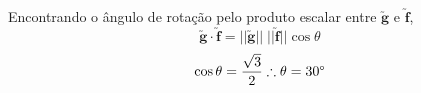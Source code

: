 \begin{enumerate}
		Encontrando o ângulo de rotação pelo produto escalar entre $\utilde{\mathbf{g}}$ e $\utilde{\mathbf{f}}$,
		\[\utilde{\mathbf{g}}\cdot\utilde{\mathbf{f}}=||\utilde{\mathbf{g}}||\;||\utilde{\mathbf{f}}||\cos\theta\]
		\[\cos\theta=\frac{\sqrt{3}}{2}\therefore\theta=\text{30\textdegree}\]
		
	\end{enumerate}
	